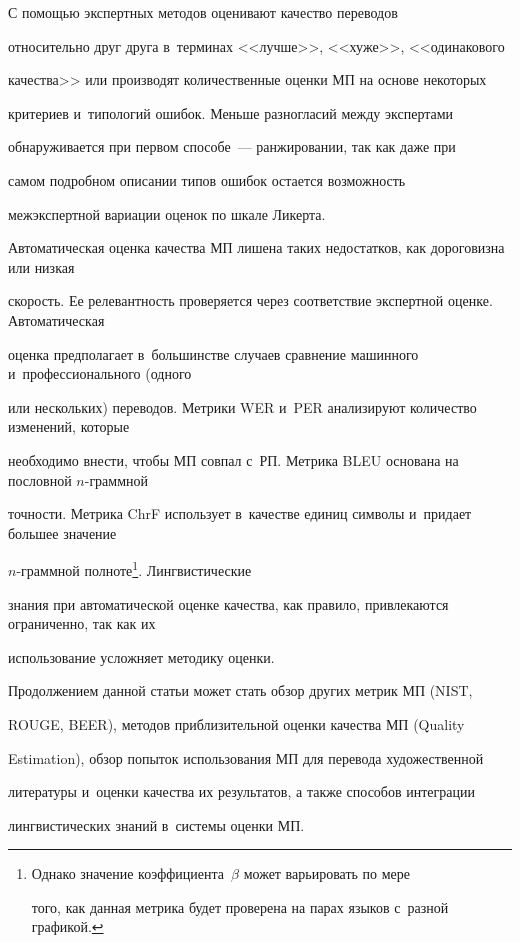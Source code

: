   

  С помощью экспертных методов оценивают качество переводов 

относительно друг друга в~терминах <<лучше>>, <<хуже>>, <<одинакового 

качества>> или производят количественные оценки МП на основе некоторых 

критериев и~типологий ошибок. Меньше разногласий между экспертами 

обнаруживается при первом способе~--- ранжировании, так как даже при 

самом подробном описании типов ошибок остается возможность 

межэкспертной вариации оценок по шкале Ликерта.

  

Автоматическая оценка качества МП лишена таких недостатков, как дороговизна или низкая 

скорость. Ее релевантность проверяется через соответствие экспертной оценке. Автоматическая 

оценка предполагает в~большинстве случаев сравнение машинного и~профессионального (одного 

или нескольких) переводов. Метрики WER и~PER анализируют количество изменений, которые 

необходимо внести, чтобы МП совпал с~РП. Метрика BLEU основана на пословной $n$-грам\-мной 

точности. Метрика ChrF использует в~качестве единиц символы и~придает большее значение 

$n$-граммной полноте\footnote{Однако значение коэффициента~$\beta$ может варьировать по мере 

того, как данная метрика будет проверена на парах языков с~разной графикой.}. Лингвистические 

знания при автоматической оценке качества, как правило, привлекаются ограниченно, так как их 

использование усложняет методику оценки.

  

  Продолжением данной статьи может стать обзор других метрик МП (NIST, 

ROUGE, BEER), методов приблизительной оценки качества МП (Quality 

Estimation), обзор попыток использования МП для перевода художественной 

литературы и~оценки качества их результатов, а также способов интеграции 

лингвистических знаний в~системы оценки МП.



